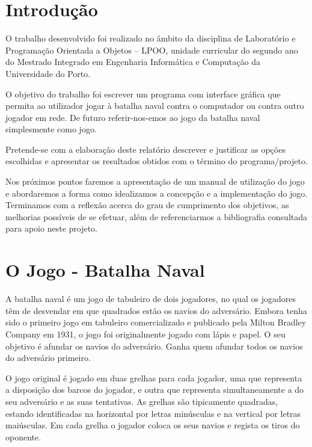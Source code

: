 \documentclass[12pt,a4paper,reqno]{report}
\numberwithin{equation}{section}
\begin{document}


\tableofcontents


\chapter{Introdução}

O trabalho desenvolvido foi realizado no âmbito da disciplina de Laboratório e Programação Orientada a Objetos – LPOO, unidade curricular do segundo ano do Mestrado Integrado em Engenharia Informática e Computação da Universidade do Porto.

O objetivo do trabalho foi escrever um programa com interface gráfica que permita ao utilizador jogar à batalha naval contra o computador ou contra outro jogador em rede. De futuro referir-nos-emos ao jogo da batalha naval simplesmente como jogo.

Pretende-se com a elaboração deste relatório descrever e justificar as opções escolhidas e apresentar os resultados obtidos com o término do programa/projeto.

Nos próximos pontos faremos a apresentação de um manual de utilização do jogo e abordaremos a forma como idealizamos a concepção e a implementação do jogo. Terminamos com a reflexão acerca do grau de cumprimento dos objetivos, as melhorias possíveis de se efetuar, além de referenciarmos a bibliografia consultada para apoio neste projeto.


\chapter{O Jogo - Batalha Naval}

A batalha naval é um jogo de tabuleiro de dois jogadores, no qual os jogadores têm de desvendar em que quadrados estão os navios do adversário. Embora tenha sido o primeiro jogo em tabuleiro comercializado e publicado pela Milton Bradley Company em 1931, o jogo foi originalmente jogado com lápis e papel. O seu objetivo é afundar os navios do adversário. Ganha quem afundar todos os navios do adversário primeiro.

O jogo original é jogado em duas grelhas para cada jogador, uma que representa a disposição dos barcos do jogador, e outra que representa simultaneamente a do seu adversário e as suas tentativas. As grelhas são tipicamente quadradas, estando identificadas na horizontal por letras minúsculas e na vertical por letras maiúsculas. Em cada grelha o jogador coloca os seus navios e regista os tiros do oponente.
\end{document}
